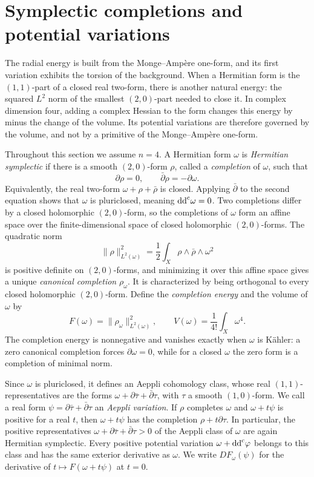 \section{Symplectic completions and potential variations}
\label{sec:completion-energy}

The radial energy is built from the Monge--Amp\`ere one-form, and its first variation exhibits the torsion of the background. When a Hermitian form is the $(1,1)$-part of a closed real two-form, there is another natural energy: the squared $L^2$ norm of the smallest $(2,0)$-part needed to close it. In complex dimension four, adding a complex Hessian to the form changes this energy by minus the change of the volume. Its potential variations are therefore governed by the volume, and not by a primitive of the Monge--Amp\`ere one-form.

Throughout this section we assume $n=4$. A Hermitian form $\omega$ is \emph{Hermitian symplectic} if there is a smooth $(2,0)$-form $\rho$, called a \emph{completion} of $\omega$, such that
\[
 \partial\rho=0,\qquad \bar\partial\rho=-\partial\omega.
\]
Equivalently, the real two-form $\omega+\rho+\bar\rho$ is closed. Applying $\bar\partial$ to the second equation shows that $\omega$ is pluriclosed, meaning $\mathrm{dd}^{\mathrm{c}}\omega=0$. Two completions differ by a closed holomorphic $(2,0)$-form, so the completions of $\omega$ form an affine space over the finite-dimensional space of closed holomorphic $(2,0)$-forms. The quadratic norm
\[
 \|\rho\|_{L^2(\omega)}^2
   =\frac12\int_X\rho\wedge\bar\rho\wedge\omega^2
\]
is positive definite on $(2,0)$-forms, and minimizing it over this affine space gives a unique \emph{canonical completion} $\rho_\omega$. It is characterized by being orthogonal to every closed holomorphic $(2,0)$-form. Define the \emph{completion energy} and the volume of $\omega$ by
\[
 F(\omega)=\|\rho_\omega\|_{L^2(\omega)}^2,
 \qquad V(\omega)=\frac1{4!}\int_X\omega^4.
\]
The completion energy is nonnegative and vanishes exactly when $\omega$ is K\"ahler: a zero canonical completion forces $\partial\omega=0$, while for a closed $\omega$ the zero form is a completion of minimal norm.

Since $\omega$ is pluriclosed, it defines an Aeppli cohomology class, whose real $(1,1)$-representatives are the forms $\omega+\partial\bar\tau+\bar\partial\tau$, with $\tau$ a smooth $(1,0)$-form. We call a real form $\psi=\partial\bar\tau+\bar\partial\tau$ an \emph{Aeppli variation}. If $\rho$ completes $\omega$ and $\omega+t\psi$ is positive for a real $t$, then $\omega+t\psi$ has the completion $\rho+t\partial\tau$. In particular, the positive representatives $\omega+\partial\bar\tau+\bar\partial\tau>0$ of the Aeppli class of $\omega$ are again Hermitian symplectic. Every positive potential variation $\omega+\mathrm{dd}^{\mathrm{c}}\varphi$ belongs to this class and has the same exterior derivative as $\omega$. We write $DF_\omega(\psi)$ for the derivative of $t\mapsto F(\omega+t\psi)$ at $t=0$.

